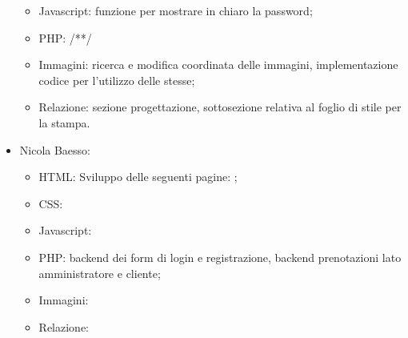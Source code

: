 \documentclass[]{article}
\begin{document}
\begin{itemize}
\begin{itemize}
		\item Javascript: funzione per mostrare in chiaro la password;
		\item PHP: /**/
		\item Immagini: ricerca e modifica coordinata delle immagini, implementazione codice per l'utilizzo delle stesse;
		\item Relazione: sezione progettazione, sottosezione relativa al foglio di stile per la stampa. 
	\end{itemize} 
	\item Nicola Baesso:
	\begin{itemize}
		\item HTML: Sviluppo delle seguenti pagine: ;
		\item CSS:
		\item Javascript:
		\item PHP: backend dei form di login e registrazione, backend prenotazioni lato amministratore e cliente;
		\item Immagini:
		\item Relazione:
	\end{itemize} 
\end{itemize}
\end{document}
